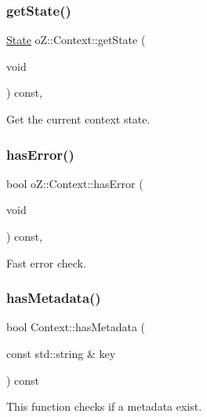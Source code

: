 \subsubsection{\texorpdfstring{getState()}{getState()}}
{\footnotesize\ttfamily \mbox{\hyperlink{namespaceo_z_a356b278f7c65def0cae75fca8cae268e}{State}} o\+Z\+::\+Context\+::get\+State (\begin{DoxyParamCaption}\item[{void}]{ }\end{DoxyParamCaption}) const\hspace{0.3cm}{\ttfamily [inline]}, {\ttfamily [noexcept]}}



Get the current context\textquotesingle{} state. 

\mbox{\label{classo_z_1_1_context_a53afdf1400b5ec8429b09da40662a34d}} 
\subsubsection{\texorpdfstring{hasError()}{hasError()}}
{\footnotesize\ttfamily bool o\+Z\+::\+Context\+::has\+Error (\begin{DoxyParamCaption}\item[{void}]{ }\end{DoxyParamCaption}) const\hspace{0.3cm}{\ttfamily [inline]}, {\ttfamily [noexcept]}}



Fast error check. 

\mbox{\label{classo_z_1_1_context_aac0bec30406ebdb0f41d286d9b42a2ec}} 
\subsubsection{\texorpdfstring{hasMetadata()}{hasMetadata()}}
{\footnotesize\ttfamily bool Context\+::has\+Metadata (\begin{DoxyParamCaption}\item[{const std\+::string \&}]{key }\end{DoxyParamCaption}) const}



This function checks if a metadata exist. 

